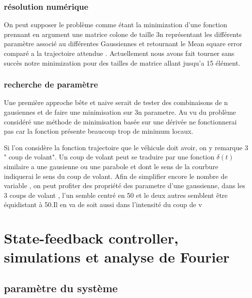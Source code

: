 \documentclass[11pt,a4paper]{article}
\begin{document}
\subsubsection{résolution numérique}
On peut supposer le problème comme étant la minimization d'une fonction prennant en argument une matrice colone de taille 3n représentant les différents paramètre associé au différentes Gaussiennes et retournant le Mean square error comparé a la trajectoire attendue .
Actuellement nous avons fait tourner sans succès notre minimization pour des tailles de matrice allant jusqu'a 15 élément.
\subsubsection{recherche de paramètre}


Une première approche bête et naive serait de tester des combinaisons de n gausiennes  et de faire une minimisation sur 3n parametre.
Au vu du problème considéré une méthode de minimisation basée sur une dérivée ne fonctionnerai pas car la fonction présente beaucoup trop de minimum locaux.

Si l'on considère la fonction trajectoire que le véhicule doit avoir, on y remarque 3 " coup de volant". Un coup de volant peut se traduire par une fonction $\delta(t) $
similaire a une gausienne ou une parabole et dont le sens de la courbure indiquerai le sens du coup de volant.
Afin de simplifier encore le nombre de variable , on peut profiter des propriété des parametre d'une gaussienne, dans les 3 coups de volant , l'un semble centré en 50 et le deux autres semblent être équidistant à 50.Il en va de soit aussi dans l'intensité du coup de v 

\section{State-feedback controller, simulations et analyse de Fourier}
\subsection{paramètre du système}
\end{document}
